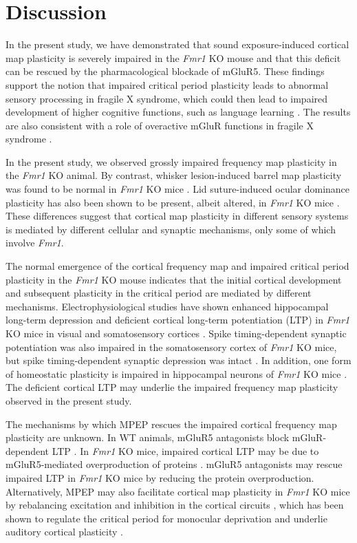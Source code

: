 \section{Discussion}

In the present study, we have demonstrated that sound exposure-induced cortical map plasticity is severely impaired in the \textit{Fmr1} KO mouse and that this deficit can be rescued by the pharmacological blockade of mGluR5. These findings support the notion that impaired critical period plasticity leads to abnormal sensory processing in fragile X syndrome, which could then lead to impaired development of higher cognitive functions, such as language learning \cite{Leblanc2011}. The results are also consistent with a role of overactive mGluR functions in fragile X syndrome \cite{Bear2004, Dolen2007}.

In the present study, we observed grossly impaired frequency map plasticity in the \textit{Fmr1} KO animal. By contrast, whisker lesion-induced barrel map plasticity was found to be normal in \textit{Fmr1} KO mice \cite{Harlow2010a}. Lid suture-induced ocular dominance plasticity has also been shown to be present, albeit altered, in \textit{Fmr1} KO mice \cite{Dolen2007}. These differences suggest that cortical map plasticity in different sensory systems is mediated by different cellular and synaptic mechanisms, only some of which involve \textit{Fmr1}.

The normal emergence of the cortical frequency map and impaired critical period plasticity in the \textit{Fmr1} KO mouse indicates that the initial cortical development and subsequent plasticity in the critical period are mediated by different mechanisms. Electrophysiological studies have shown enhanced hippocampal long-term depression and deficient cortical long-term potentiation (LTP) in \textit{Fmr1} KO mice in visual and somatosensory cortices \cite{Li2002, Zhao2005, Wilson2007}. Spike timing-dependent synaptic potentiation was also impaired in the somatosensory cortex of \textit{Fmr1} KO mice, but spike timing-dependent synaptic depression was intact \cite{Desai2006, Meredith2007}. In addition, one form of homeostatic plasticity is impaired in hippocampal neurons of \textit{Fmr1} KO mice \cite{Soden2010}. The deficient cortical LTP may underlie the impaired frequency map plasticity observed in the present study.

The mechanisms by which MPEP rescues the impaired cortical frequency map plasticity are unknown. In WT animals, mGluR5 antagonists block mGluR-dependent LTP \cite{Wang2003, Wilson2007}. In \textit{Fmr1} KO mice, impaired cortical LTP may be due to mGluR5-mediated overproduction of proteins \cite{Dolen2007, Dolen2008}. mGluR5 antagonists may rescue impaired LTP in \textit{Fmr1} KO mice by reducing the protein overproduction. Alternatively, MPEP may also facilitate cortical map plasticity in \textit{Fmr1} KO mice by rebalancing excitation and inhibition in the cortical circuits \cite{Chuang2005, Selby2007, Curia2009}, which has been shown to regulate the critical period for monocular deprivation and underlie auditory cortical plasticity \cite{Hensch2004, Dorrn2010}.

